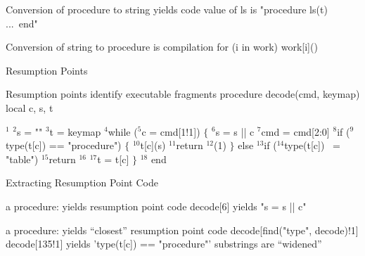 \Bullet Conversion of procedure to string yields code
		value of {\pt ls} is {\pt "procedure ls(t) ...\ end"}

\Bullet Conversion of string to procedure is compilation
\program
		for (i in work)
			work[i]()
\endprogram
\NewPage
\centerline{\bigrm Resumption Points}
\Bullet Resumption points identify executable fragments
\begingroup\medskip\pt
	procedure decode(cmd, keymap)
		local c, s, t

		$^1$
		$^2$s = ""
		$^3$t = keymap
		$^4$while ($^5$c = cmd[1!1]) $\{$
			$^6$s = s || c
			$^7$cmd = cmd[2:0]
			$^8$if ($^9$type(t[c]) == "procedure") $\{$
				$^{10}$t[c](s)
				$^{11}$return $^{12}$(1)
				$\}$
			else $^{13}$if ($^{14}$type(t[c]) ~= "table")
				$^{15}$return $^{16}$
			$^{17}$t = t[c]
			$\}$
		$^{18}$
	end
\endprogram
\NewPage
\centerline{\bigrm Extracting Resumption Point Code}
 a procedure:
		yields resumption point code
\medskip
		{\pt decode[6]} yields {\pt "s = s || c"}

 a procedure:
		yields ``closest'' resumption point code
\program
		decode[find("type", decode)!1]
		decode[135!1]
\endprogram
\medskip
		yields {\pt 'type(t[c]) == "procedure"'}
		substrings are ``widened''

